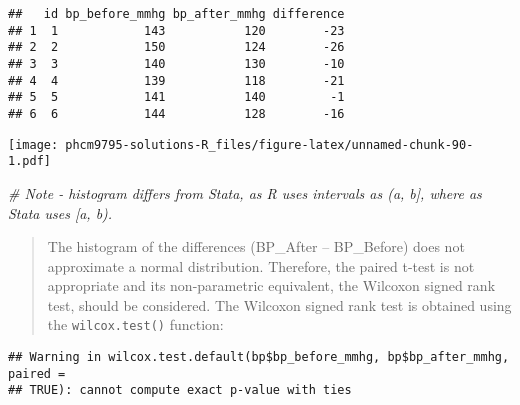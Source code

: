 \documentclass[
]{memoir}
\newenvironment{Shaded}{\begin{snugshade}}{\end{snugshade}}
\newcommand{\AttributeTok}[1]{\textcolor[rgb]{0.77,0.63,0.00}{#1}}
\newcommand{\CommentTok}[1]{\textcolor[rgb]{0.56,0.35,0.01}{\textit{#1}}}
\newcommand{\ConstantTok}[1]{\textcolor[rgb]{0.00,0.00,0.00}{#1}}
\newcommand{\FunctionTok}[1]{\textcolor[rgb]{0.00,0.00,0.00}{#1}}
\newcommand{\NormalTok}[1]{#1}
\newcommand{\SpecialCharTok}[1]{\textcolor[rgb]{0.00,0.00,0.00}{#1}}
\newcommand{\StringTok}[1]{\textcolor[rgb]{0.31,0.60,0.02}{#1}}
\begin{document}
\begin{verbatim}
##   id bp_before_mmhg bp_after_mmhg difference
## 1  1            143           120        -23
## 2  2            150           124        -26
## 3  3            140           130        -10
## 4  4            139           118        -21
## 5  5            141           140         -1
## 6  6            144           128        -16
\end{verbatim}

\begin{Shaded}
\end{Shaded}

\texttt{[image: phcm9795-solutions-R\_files/figure-latex/unnamed-chunk-90-1.pdf]}

\begin{Shaded}
\begin{Highlighting}[]
\CommentTok{\# Note {-} histogram differs from Stata, as R uses intervals as (a, b], where as Stata uses [a, b).}
\end{Highlighting}
\end{Shaded}

\begin{quote}
The histogram of the differences (BP\_After -- BP\_Before) does not approximate a normal distribution. Therefore, the paired t-test is not appropriate and its non-parametric equivalent, the Wilcoxon signed rank test, should be considered.
The Wilcoxon signed rank test is obtained using the \texttt{wilcox.test()} function:
\end{quote}

\begin{Shaded}
\end{Shaded}

\begin{verbatim}
## Warning in wilcox.test.default(bp$bp_before_mmhg, bp$bp_after_mmhg, paired =
## TRUE): cannot compute exact p-value with ties
\end{verbatim}
\end{document}
